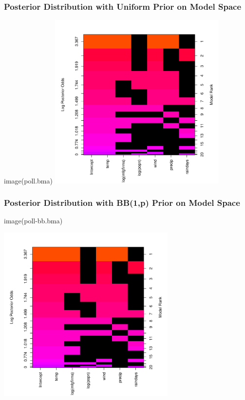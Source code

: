 \documentclass[handout]{beamer}
\begin{document}
\begin{frame}\frametitle{Posterior Distribution  with Uniform Prior on Model Space}
image(poll.bma)
\centering
\includegraphics[height=3.5in]{poll-image}  
\end{frame}

\begin{frame}\frametitle{Posterior Distribution  with BB(1,p) Prior on Model Space}
image(poll-bb.bma)

\centering
\includegraphics[height=3.5in]{poll-image}  
\end{frame}
\end{document}
